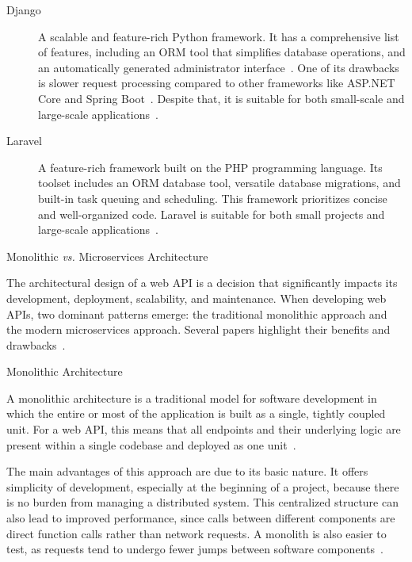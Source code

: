 \documentclass[12pt, reqno]{amsbook}
\makeatletter
\def\section{\@startsection{section}{1}%
      \z@{.5\linespacing\@plus.7\linespacing}{.25\linespacing}%
      {\normalfont\bfseries\flushleft}}
\def\subsection{\@startsection{subsection}{2}%
      \z@{.5\linespacing\@plus.7\linespacing}{.25\linespacing}%
      {\normalfont\bfseries\flushleft}}
\theoremstyle{definition}
\theoremstyle{definition}
\numberwithin{section}{chapter}
\numberwithin{table}{chapter}
\numberwithin{figure}{chapter}
\makeatother
\begin{document}
\begin{description}
  \item [Django] A scalable and feature-rich Python framework. It has a comprehensive list of features, including an \ac{ORM} tool that simplifies database operations, and an automatically generated administrator interface~\cite{Mozilla, Zanevych2024, Chen2017}. One of its drawbacks is slower request processing compared to other frameworks like ASP.NET Core and Spring Boot~\cite{Haque2022, Choma2023}. Despite that, it is suitable for both small-scale and large-scale applications~\cite{Mozilla, Zanevych2024}.
  \item [Laravel] A feature-rich framework built on the PHP programming language. Its toolset includes an \ac{ORM} database tool, versatile database migrations, and built-in task queuing and scheduling. This framework prioritizes concise and well-organized code. Laravel is suitable for both small projects and large-scale applications~\cite{Mozilla, Madurapperuma2022, Nguyen2022}.
\end{description}

\section{Monolithic \textit{vs.} Microservices Architecture}
\label{Section:Monolithic_vs_Microservices_Architecture}

The architectural design of a web \ac{API} is a decision that significantly impacts its development, deployment, scalability, and maintenance. When developing web \acp{API}, two dominant patterns emerge: the traditional monolithic approach and the modern microservices approach. Several papers highlight their benefits and drawbacks~\cite{Huf2019, Taibi2018, Adrio2023, Moysiadis2022}.

\subsection{Monolithic Architecture}
\label{Subsection:Monolithic_Architecture}

A monolithic architecture is a traditional model for software development in which the entire or most of the application is built as a single, tightly coupled unit. For a web \ac{API}, this means that all endpoints and their underlying logic are present within a single codebase and deployed as one unit~\cite{Taibi2018, Adrio2023, Moysiadis2022, Figueira2024, Kenan2020, Yoo2025}.

The main advantages of this approach are due to its basic nature. It offers simplicity of development, especially at the beginning of a project, because there is no burden from managing a distributed system. This centralized structure can also lead to improved performance, since calls between different components are direct function calls rather than network requests. A monolith is also easier to test, as requests tend to undergo fewer jumps between software components~\cite{Taibi2018, Adrio2023, Moysiadis2022, Figueira2024, Kenan2020, Blinowski2022}.
\end{document}
